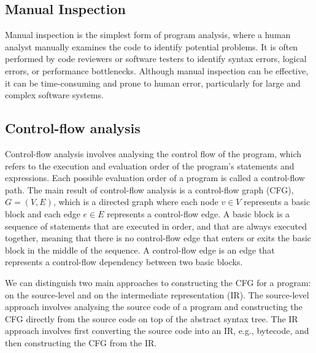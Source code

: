 \subsection{Manual Inspection}
Manual inspection is the simplest form of program analysis, where a human analyst 
manually examines the code to identify potential problems. It is often performed
by code reviewers or software testers to identify syntax errors, logical errors, 
or performance bottlenecks. Although manual inspection can be effective, it can 
be time-consuming and prone to human error, particularly for large and complex 
software systems.



\subsection{Control-flow analysis}
Control-flow analysis involves analysing the control flow of the program, which refers
to the execution and evaluation order of the program's statements and expressions.
Each possible evaluation order of a program is called a control-flow path.
The main result of control-flow analysis is a control-flow graph (CFG), $G = (V, E)$, 
which is a directed graph where each node $v \in V$ represents a basic block
and each edge $e \in E$ represents a control-flow edge. A basic block is a sequence of
statements that are executed in order, and that are always executed together, meaning
that there is no control-flow edge that enters or exits the basic block in the middle of the sequence.
A control-flow edge is an edge that represents a control-flow dependency between two basic blocks.

We can distinguish two main approaches to constructing the CFG for a program:
on the source-level and on the intermediate representation (IR). The source-level approach
involves analysing the source code of a program and constructing the CFG
directly from the source code on top of the abstract syntax tree. The IR approach involves
first converting the source code into an IR, e.g., bytecode,
and then constructing the CFG from the IR.

